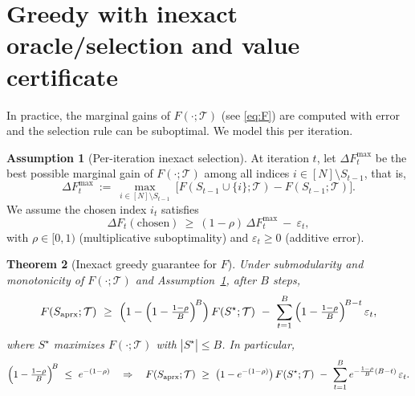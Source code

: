 \documentclass[accepted]{uai2026}
\theoremstyle{plain}
\newtheorem{theorem}{Theorem}[section]
\theoremstyle{definition}
\newtheorem{assumption}[theorem]{Assumption}
\theoremstyle{remark}
\begin{document}



\section{Greedy with inexact oracle/selection and value certificate}
\label{sec:greedy-inexact}

In practice, the marginal gains of $F(\cdot;\mathcal T)$ (see \eqref{eq:F}) are computed with error
and the selection rule can be suboptimal. We model this per iteration.

\begin{assumption}[Per-iteration inexact selection]\label{asp:inexact}
At iteration $t$, let $\Delta F_t^{\max}$ be the best possible marginal gain of $F(\cdot;\mathcal T)$
among all indices $i\in [N]\setminus S_{t-1}$, that is,
\[
\Delta F_t^{\max}\ :=\ \max_{i\in [N]\setminus S_{t-1}}\ \big[F(S_{t-1}\cup\{i\};\mathcal T)-F(S_{t-1};\mathcal T)\big].
\]
We assume the chosen index $i_t$ satisfies
\[
\Delta F_t(\text{chosen})\ \ge\ (1-\rho)\,\Delta F_t^{\max}\ -\ \varepsilon_t,
\]
with $\rho\in[0,1)$ (multiplicative suboptimality) and $\varepsilon_t\ge 0$ (additive error).
\end{assumption}

\begin{theorem}[Inexact greedy guarantee for $F$]\label{thm:greedy-inexact}
Under submodularity and monotonicity of $F(\cdot;\mathcal T)$ and Assumption~\ref{asp:inexact}, after $B$ steps,
\[
F(S_{\rm aprx};\mathcal T)\ \ge\ 
\Big(1-\Big(1-\tfrac{1-\rho}{B}\Big)^{\!B}\Big)\,F(S^\star;\mathcal T)\ -\ 
\sum_{t=1}^B \Big(1-\tfrac{1-\rho}{B}\Big)^{\!B-t}\,\varepsilon_t,
\]
where $S^\star$ maximizes $F(\cdot;\mathcal T)$ with $|S^\star|\le B$. In particular,
\[
\Big(1-\tfrac{1-\rho}{B}\Big)^{\!B}\ \le\ e^{-(1-\rho)}
\quad\Rightarrow\quad
F(S_{\rm aprx};\mathcal T)\ \ge\ \big(1-e^{-(1-\rho)}\big)\,F(S^\star;\mathcal T)\ -\ 
\sum_{t=1}^B e^{-\frac{1-\rho}{B}(B-t)}\,\varepsilon_t.
\]
\end{theorem}
\end{document}
